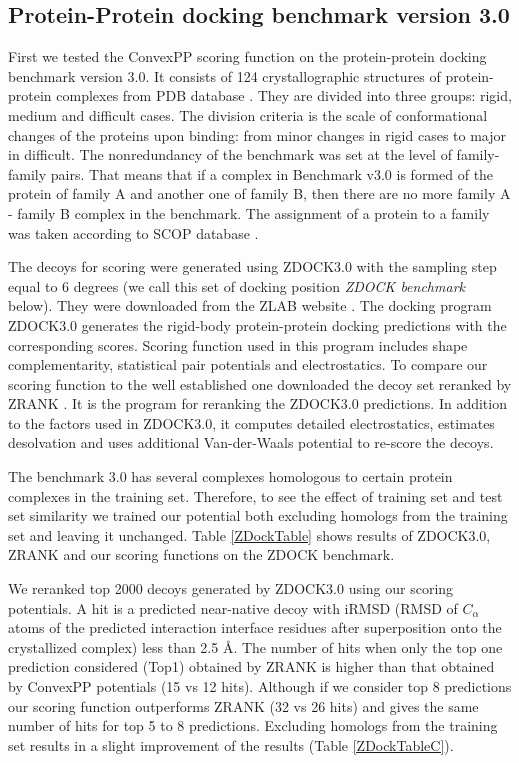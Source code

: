 \subsection{Protein-Protein docking benchmark version 3.0}
First we tested the ConvexPP scoring function on the protein-protein docking benchmark version 3.0. It consists of 124 crystallographic structures of protein-protein complexes 
from PDB database \cite{hwang2008protein}. They are divided into three groups: rigid,
medium and difficult cases. The division criteria is the scale of conformational changes of the proteins upon binding: from minor changes in rigid cases to major in difficult. 
The nonredundancy of the benchmark was set at the level of 
family-family pairs. That means that if a complex in Benchmark v3.0 is formed of the protein of family A and another one of family B,
then there are no more family A - family B complex in the benchmark. The assignment of a protein to a family was taken according to SCOP database \cite{murzin1995scop}.

The decoys for scoring were generated using ZDOCK3.0 \cite{pierce2011accelerating} with the sampling step equal to 6 degrees (we call this set of docking position \emph{ZDOCK benchmark} below).
They were downloaded from the ZLAB website \cite{ZDOCKDecoysLink}.
The docking program ZDOCK3.0 generates the rigid-body protein-protein docking predictions with the corresponding scores.
Scoring function used in this program includes shape complementarity, statistical pair potentials and electrostatics. 
To compare our scoring function to the well established one downloaded the decoy set reranked by ZRANK \cite{pierce2007zrank}. 
It is the program for reranking the ZDOCK3.0 predictions. 
In addition to the factors used in ZDOCK3.0, it computes detailed electrostatics, estimates desolvation and uses additional Van-der-Waals potential to re-score the decoys. 

The benchmark 3.0 has several complexes homologous to certain protein complexes in the training set. Therefore, to see the effect of training set and test set similarity
we trained our potential both excluding homologs from the training set and leaving it unchanged. 
Table \ref{ZDockTable} shows results of ZDOCK3.0, ZRANK and our scoring functions on the ZDOCK benchmark.

\newpage


We reranked top 2000 decoys generated by ZDOCK3.0 using our scoring potentials. A hit is a predicted near-native decoy with iRMSD (RMSD of $C_\alpha$ atoms of the 
predicted interaction interface residues after superposition onto the crystallized complex) less than 2.5 \AA. 
The number of hits when only the top one prediction considered (Top1) obtained by ZRANK is higher than that obtained by ConvexPP potentials (15 vs 12 hits).
Although if we consider top 8 predictions our scoring function outperforms ZRANK (32 vs 26 hits) and gives the same number of hits for top 5 to 8 predictions.
Excluding homologs from the training set results in a slight improvement of the results (Table \ref{ZDockTableC}).

